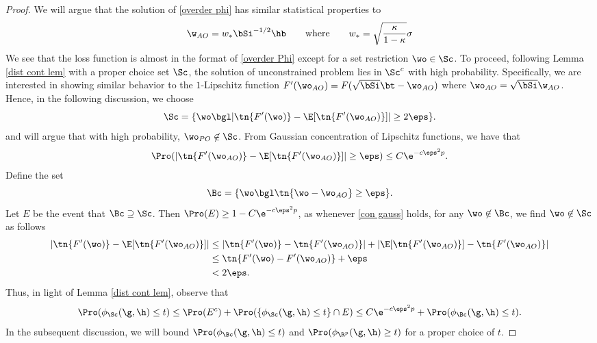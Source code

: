\begin{proof}
We will argue that the solution of \ref{overder phi} has similar statistical properties to 
\[
\w_{AO}=w_*\bSi^{-1/2}\hb\qquad\text{where}\qquad w_*=\sqrt{\frac{\kappa}{1-\kappa}}\sigma
\]
We see that the loss function is almost in the format of \eqref{overder Phi} except for a set restriction $\wo\in\Sc$. To proceed, following Lemma \ref{dist cont lem} with a proper choice set $\Sc$, the solution of unconstrained problem lies in $\Sc^c$ with high probability. Specifically, we are interested in showing similar behavior to the $1$-Lipschitz function $F'(\wo_{AO})=F(\sqrt{\bSi}\bt-\wo_{AO})$ where $\wo_{AO}=\sqrt{\bSi}\w_{AO}$. Hence, in the following discussion, we choose 
\[
\Sc=\{\wo\bgl |\tn{F'(\wo)}-{\E[\tn{F'(\wo_{AO})}]}|\geq 2\eps\}.
\]
and will argue that with high probability, $\wo_{PO}\not\in\Sc$. From Gaussian concentration of Lipschitz functions, we have that
\begin{align}
\Pro(|\tn{F'(\wo_{AO})}-\E[\tn{F'(\wo_{AO})}]|\geq \eps)\leq C\e^{-c\eps^2p}.\label{con gauss}
\end{align}
Define the set %
\[
\Bc=\{\wo\bgl\tn{\wo-\wo_{AO}}\geq \eps\}.
\]
Let $E$ be the event that $\Bc\supseteq\Sc$. Then $\Pro(E)\geq 1-C\e^{-c\eps^2p}$, as whenever \eqref{con gauss} holds, for any $\wo\not\in\Bc$, we find $\wo\not\in\Sc$ as follows
\begin{align}
|\tn{F'(\wo)}-\E[\tn{F'(\wo_{AO})}]|&\leq|\tn{F'(\wo)}-\tn{F'(\wo_{AO})}|+|\E[\tn{F'(\wo_{AO})}]-\tn{F'(\wo_{AO})}|\\
&\leq\tn{F'(\wo)-F'(\wo_{AO})}+\eps\\
&< 2\eps.
\end{align}
Thus, in light of Lemma \ref{dist cont lem}, observe that 
\[
\Pro(\phi_\Sc(\g,\h)\leq t)\leq \Pro(E^c)+\Pro(\{\phi_{\Sc}(\g,\h)\leq t\}\cap E)\leq C\e^{-c\eps^2p}+\Pro(\phi_{\Bc}(\g,\h)\leq t).
\]
In the subsequent discussion, we will bound $\Pro(\phi_{\Bc}(\g,\h)\leq t)$ and $\Pro(\phi_{\R^p}(\g,\h)\geq t)$ for a proper choice of $t$.


\end{proof}
